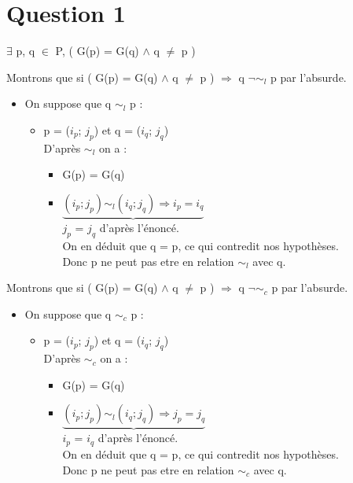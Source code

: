 
\section{Question 1}

$\exists$ p, q $\in$ P, ( G(p) = G(q) $\wedge$ q $\neq$ p )

Montrons que si ( G(p) = G(q) $\wedge$ q $\neq$ p ) $\Rightarrow$ q $\neg \sim_{l}$ p par l'absurde.

\begin{itemize}
\item On suppose que q $\sim_{l}$ p :
	\begin{itemize}
	\item p = ($i_p$; $j_p$) et q = ($i_q$; $j_q$)\\
	D'apr\`es $\sim_{l}$  on a :
		\begin{itemize}
		\item G(p) = G(q)
		\item $\underbrace{(i_p; j_p) \sim_{l} (i_q; j_q) \Rightarrow i_p = i_q}$\\
		$j_p$ = $j_q$ d'apr\`es l'\'enonc\'e.\\
		On en d\'eduit que q = p, ce qui contredit nos hypoth\`eses. \\
		Donc p ne peut pas etre en relation $\sim_{l}$ avec q.
		\end{itemize}
	\end{itemize}
\end{itemize}

\bigskip 
Montrons que si ( G(p) = G(q) $\wedge$ q $\neq$ p ) $\Rightarrow$ q $\neg \sim_{c}$ p par l'absurde.

\begin{itemize}
\item On suppose que q $\sim_{c}$ p :
	\begin{itemize}
	\item p = ($i_p$; $j_p$) et q = ($i_q$; $j_q$)\\
	D'apr\`es $\sim_{c}$  on a :
		\begin{itemize}
		\item G(p) = G(q)
		\item $\underbrace{(i_p; j_p) \sim_{l} (i_q; j_q) \Rightarrow j_p = j_q}$\\
		$i_p$ = $i_q$ d'apr\`es l'\'enonc\'e.\\
		On en d\'eduit que q = p, ce qui contredit nos hypoth\`eses. \\
		Donc p ne peut pas etre en relation $\sim_{c}$ avec q.
		\end{itemize}
	\end{itemize}
\end{itemize}


